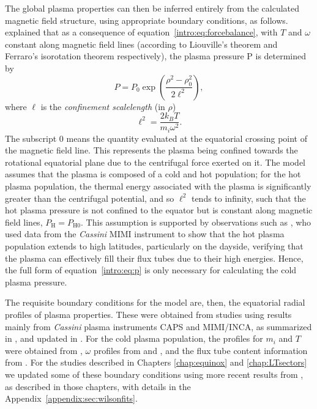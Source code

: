 The global plasma properties can then be inferred entirely from the calculated magnetic field structure, using appropriate boundary conditions, as follows. \citet{caudal1986} explained that as a consequence of equation~\ref{intro:eq:forcebalance}, with $T$ and $\omega$ constant along magnetic field lines (according to Liouville's theorem and Ferraro's isorotation theorem respectively), the plasma pressure P is determined by 
\begin{equation}\label{intro:eq:p}
P = P_{0}\exp\left(\frac{\rho^2-\rho_0^2}{2\ell^2}\right),
\end{equation}
where $\ell$ is the \textit{confinement scalelength} (in $\rho$)
\begin{equation}
\ell^2 = \frac{2k_BT}{m_i\omega^2}.
\end{equation}
The subscript 0 means the quantity evaluated at the equatorial crossing point of the magnetic field line. This represents the plasma being confined towards the rotational equatorial plane due to the centrifugal force exerted on it. The model assumes that the plasma is composed of a cold and hot population; for the hot plasma population, the thermal energy associated with the plasma is significantly greater than the centrifugal potential, and so $\ell^2$ tends to infinity, such that the hot plasma pressure is not confined to the equator but is constant along magnetic field lines, $P_\mathrm{H} = P_\mathrm{H0}$. This assumption is supported by observations such as \citet{krimigis2007}, who used data from the \textit{Cassini} MIMI instrument to show that the hot plasma population extends to high latitudes, particularly on the dayside, verifying that the plasma can effectively fill their flux tubes due to their high energies.  Hence, the full form of equation~\ref{intro:eq:p} is only necessary for calculating the cold plasma pressure.

The requisite boundary conditions for the model are, then, the equatorial radial profiles of plasma properties. These were obtained from studies using results mainly from \textit{Cassini} plasma instruments CAPS and MIMI/INCA, as summarized in \citet{achilleos2010a}, and updated in \citet{achilleos2010b}. For the cold plasma population, the profiles for $m_i$ and $T$ were obtained from \citet{wilson2008}, $\omega$ profiles from \citet{wilson2008} and \citet{kane2008}, and the flux tube content information from \citet{mcandrews2009}. For the studies described in Chapters \ref{chap:equinox} and \ref{chap:LTsectors} we updated some of these boundary conditions using more recent results from \citet{wilson2017}, as described in those chapters, with details in the Appendix~\ref{appendix:sec:wilsonfits}.

